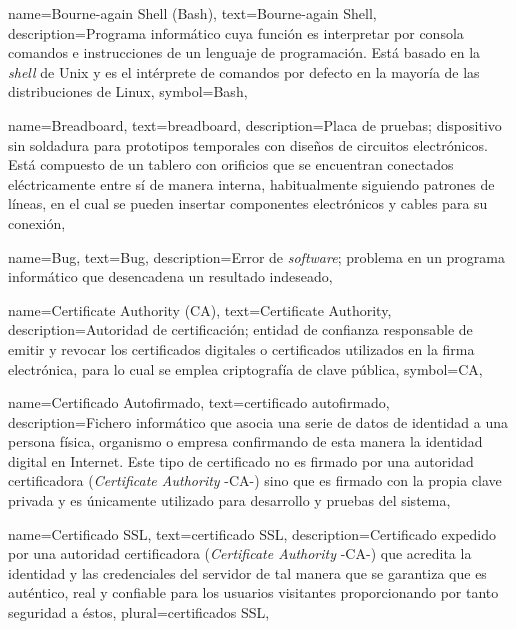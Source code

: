 {
    name={Bourne-again Shell (Bash)},
    text={Bourne-again Shell},
    description={Programa informático cuya función es interpretar por consola comandos e instrucciones de un lenguaje de programación. Está basado en la \textit{shell} de Unix y es el intérprete de comandos por defecto en la mayoría de las distribuciones de Linux},
    symbol={Bash},
}	
	
{
    name={Breadboard},
    text={breadboard},
    description={Placa de pruebas; dispositivo sin soldadura para prototipos temporales con diseños de circuitos electrónicos. Está compuesto de un tablero con orificios que se encuentran conectados eléctricamente entre sí de manera interna, habitualmente siguiendo patrones de líneas, en el cual se pueden insertar componentes electrónicos y cables para su conexión},
}

{
    name={Bug},
    text={Bug},
    description={Error de \textit{software}; problema en un programa informático que desencadena un resultado indeseado},
}

{
    name={Certificate Authority (CA)},
    text={Certificate Authority},
    description={Autoridad de certificación; entidad de confianza responsable de emitir y revocar los certificados digitales o certificados utilizados en la firma electrónica, para lo cual se emplea criptografía de clave pública},
    symbol={CA},
}

{
    name={Certificado Autofirmado},
    text={certificado autofirmado},
    description={Fichero informático que asocia una serie de datos de identidad a una persona física, organismo o empresa confirmando de esta manera la identidad digital en Internet. Este tipo de certificado no es firmado por una autoridad certificadora (\textit{Certificate Authority} -CA-) sino que es firmado con la propia clave privada y es únicamente utilizado para desarrollo y pruebas del sistema},
}

{
    name={Certificado SSL},
    text={certificado SSL},
    description={Certificado expedido por una autoridad certificadora (\textit{Certificate Authority} -CA-) que acredita la identidad y las credenciales del servidor de tal manera que se garantiza que es auténtico, real y confiable para los usuarios visitantes proporcionando por tanto seguridad a éstos},
    plural={certificados SSL},
}

